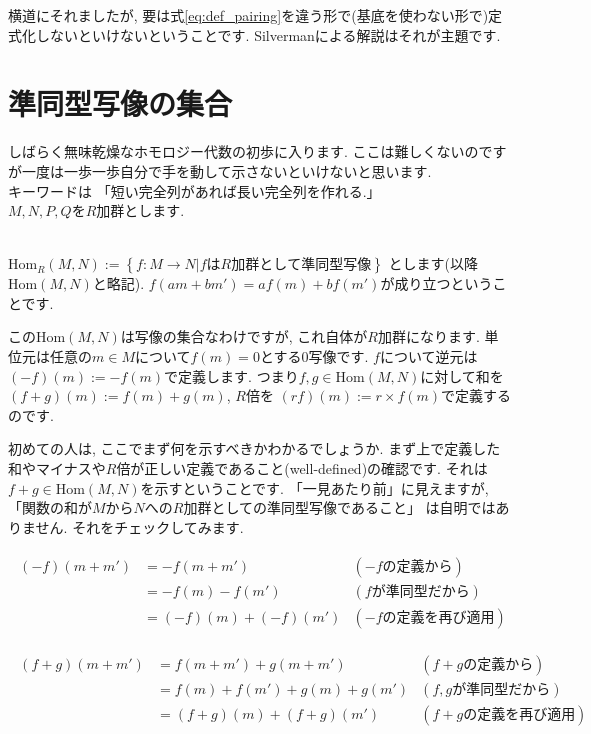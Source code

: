 \documentclass{jsarticle}
\def\Hom{\mathrm{Hom}}
\theoremstyle{definition}
\numberwithin{theorem}{section}
\begin{document}
横道にそれましたが, 要は式\ref{eq:def_pairing}を違う形で(基底を使わない形で)定式化しないといけないということです. Silvermanによる解説はそれが主題です. 

\section{準同型写像の集合}
しばらく無味乾燥なホモロジー代数の初歩に入ります. ここは難しくないのですが一度は一歩一歩自分で手を動して示さないといけないと思います.\\
キーワードは 「短い完全列があれば長い完全列を作れる.」\\
$M, N, P, Q$を$R$加群とします.

\hrulefill\\

$\Hom_R(M, N) := \left\{f: M \rightarrow N | fはR加群として準同型写像\right\}$ とします(以降$\Hom(M, N)$と略記). 
$f(am+bm') = a f(m) + bf(m')$が成り立つということです.

この$\Hom(M, N)$は写像の集合なわけですが, これ自体が$R$加群になります. 単位元は任意の$m\in M$について$f(m) = 0$とする0写像です.
$f$について逆元は$(-f)(m) := -f(m)$で定義します. つまり$f, g \in \Hom(M, N)$に対して和を$(f+g)(m) := f(m) + g(m)$, $R$倍を
$(rf)(m) := r \times f(m)$で定義するのです. 

初めての人は, ここでまず何を示すべきかわかるでしょうか. まず上で定義した和やマイナスや$R$倍が正しい定義であること(well-defined)の確認です.
それは$f+g \in \Hom(M, N)$を示すということです. 「一見あたり前」に見えますが, 「関数の和が$M$から$N$への$R$加群としての準同型写像であること」
は自明ではありません. それをチェックしてみます. 

\begin{eqnarray*}
\begin{aligned}
(-f)(m+m') &= -f(m+m') & (-fの定義から)\\
&= -f(m) - f(m') & (fが準同型だから)\\
&= (-f)(m) + (-f)(m') & (-fの定義を再び適用)
\end{aligned}
\end{eqnarray*}

\begin{eqnarray*}
\begin{aligned}
(f+g)(m+m') &= f(m+m') + g(m+m') & (f+gの定義から)\\
&= f(m)+f(m') + g(m) + g(m') & (f, gが準同型だから)\\
&= (f+g)(m) + (f+g)(m') & (f+gの定義を再び適用)
\end{aligned}
\end{eqnarray*}
\end{document}

